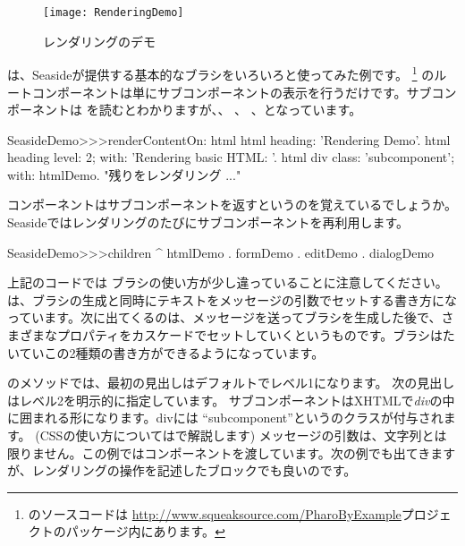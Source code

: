\documentclass[a4paper,10pt,twoside]{book}
\begin{document}
\begin{figure}[ht]
\begin{center}
\texttt{[image: RenderingDemo]}
\caption{レンダリングのデモ}
\end{center}
\end{figure}

は、Seasideが提供する基本的なブラシをいろいろと使ってみた例です。 \footnote{のソースコードは  \url{http://www.squeaksource.com/PharoByExample}プロジェクトのパッケージ内にあります。}
 のルートコンポーネントは単にサブコンポーネントの表示を行うだけです。サブコンポーネントは を読むとわかりますが、、 、 、となっています。

\needspace{7ex}
\begin{method}[renderdemo]{}
SeasideDemo>>>renderContentOn: html
	html heading: 'Rendering Demo'.
	html heading
		level: 2;
		with: 'Rendering basic HTML: '.
	html div
		class: 'subcomponent';
		with: htmlDemo.
	"残りをレンダリング ..."
\end{method}

\noindent
コンポーネントはサブコンポーネントを返すというのを覚えているでしょうか。Seasideではレンダリングのたびにサブコンポーネントを再利用します。
\begin{code}{}
SeasideDemo>>>children
	^ { htmlDemo . formDemo . editDemo . dialogDemo }
\end{code}

上記のコードでは  ブラシの使い方が少し違っていることに注意してください。は、ブラシの生成と同時にテキストをメッセージの引数でセットする書き方になっています。次に出てくるのは、メッセージを送ってブラシを生成した後で、さまざまなプロパティをカスケードでセットしていくというものです。ブラシはたいていこの2種類の書き方ができるようになっています。


のメソッドでは、最初の見出しはデフォルトでレベル1になります。
次の見出しはレベル2を明示的に指定しています。
サブコンポーネントはXHTMLで\emph{div}の中に囲まれる形になります。divには ``subcomponent''というのクラスが付与されます。
(CSSの使い方についてはで解説します)
 メッセージの引数は、文字列とは限りません。この例ではコンポーネントを渡しています。次の例でも出てきますが、レンダリングの操作を記述したブロックでも良いのです。
\end{document}
